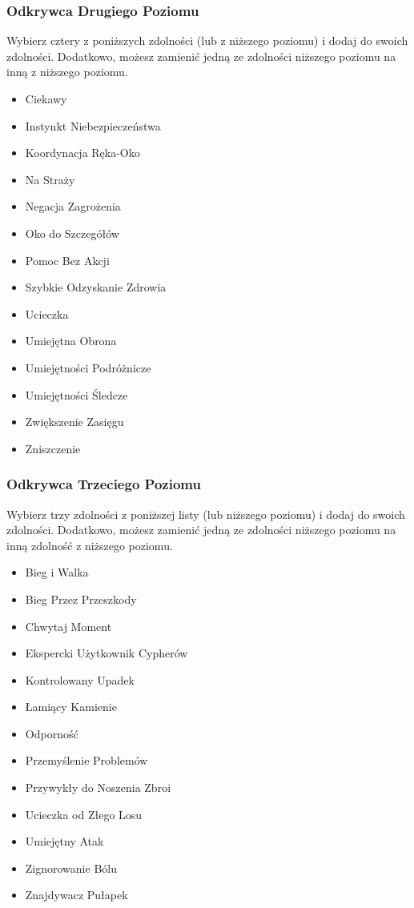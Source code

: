 \subsubsection{Odkrywca Drugiego Poziomu}

Wybierz cztery z poniższych zdolności (lub z niższego poziomu) i dodaj do swoich zdolności. Dodatkowo, możesz zamienić jedną ze zdolności niższego poziomu na inną z niższego poziomu.

\begin{itemize}
\item Ciekawy
\item Instynkt Niebezpieczeństwa
\item Koordynacja Ręka-Oko
\item Na Straży
\item Negacja Zagrożenia
\item Oko do Szczegółów
\item Pomoc Bez Akcji
\item Szybkie Odzyskanie Zdrowia
\item Ucieczka
\item Umiejętna Obrona
\item Umiejętności Podróżnicze
\item Umiejętności Śledcze
\item Zwiększenie Zasięgu
\item Zniszczenie
\end{itemize}

\subsubsection{Odkrywca Trzeciego Poziomu}

Wybierz trzy zdolności z poniższej listy (lub niższego poziomu) i dodaj do swoich zdolności. Dodatkowo, możesz zamienić jedną ze zdolności niższego poziomu na inną zdolność z niższego poziomu.

\begin{itemize}
\item Bieg i Walka
\item Bieg Przez Przeszkody
\item Chwytaj Moment
\item Ekspercki Użytkownik Cypherów
\item Kontrolowany Upadek
\item Łamiący Kamienie
\item Odporność
\item Przemyślenie Problemów
\item Przywykły do Noszenia Zbroi
\item Ucieczka od Złego Losu
\item Umiejętny Atak
\item Zignorowanie Bólu
\item Znajdywacz Pułapek
\end{itemize}


